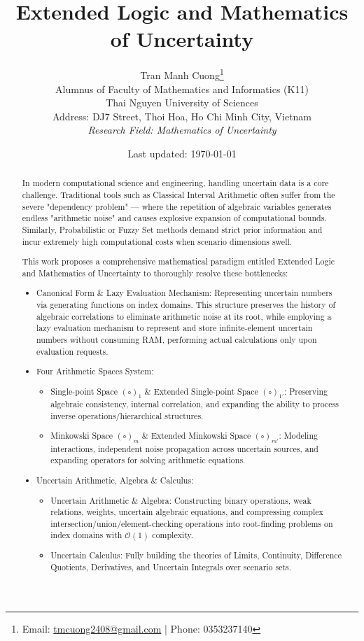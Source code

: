 \documentclass[a4paper,12pt, twoside]{memoir}
\title{Extended Logic and Mathematics of Uncertainty}
\author{
	Tran Manh Cuong\thanks{Email: \href{mailto:tmcuong2408@gmail.com}{tmcuong2408@gmail.com} | Phone: 0353237140} \\[0.5em]
	\small Alumnus of Faculty of Mathematics and Informatics (K11)
	\\ Thai Nguyen University of Sciences \\
	\small Address: DJ7 Street, Thoi Hoa, Ho Chi Minh City, Vietnam \\
	\small \textit{Research Field: Mathematics of Uncertainty}
}
\date{Last updated: \today}
\begin{document}
\maketitle

\begin{abstract}
	In modern computational science and engineering, handling uncertain data is a core challenge. Traditional tools such as Classical Interval Arithmetic often suffer from the severe "dependency problem" --- where the repetition of algebraic variables generates endless "arithmetic noise" and causes explosive expansion of computational bounds. Similarly, Probabilistic or Fuzzy Set methods demand strict prior information and incur extremely high computational costs when scenario dimensions swell.

	This work proposes a comprehensive mathematical paradigm entitled Extended Logic and Mathematics of Uncertainty to thoroughly resolve these bottlenecks:
	\begin{itemize}[leftmargin=*]
		\item Canonical Form \& Lazy Evaluation Mechanism: Representing uncertain numbers via generating functions on index domains. This structure preserves the history of algebraic correlations to eliminate arithmetic noise at its root, while employing a lazy evaluation mechanism to represent and store infinite-element uncertain numbers without consuming RAM, performing actual calculations only upon evaluation requests.

		\item Four Arithmetic Spaces System:
		      \begin{itemize}[leftmargin=*]
			      \item Single-point Space $(\circ)_1$ \& Extended Single-point Space $(\circ)_{1'}$: Preserving algebraic consistency, internal correlation, and expanding the ability to process inverse operations/hierarchical structures.
			      \item Minkowski Space $(\circ)_m$ \& Extended Minkowski Space $(\circ)_{m'}$: Modeling interactions, independent noise propagation across uncertain sources, and expanding operators for solving arithmetic equations.
		      \end{itemize}

		\item Uncertain Arithmetic, Algebra \& Calculus:
		      \begin{itemize}[leftmargin=*]
			      \item Uncertain Arithmetic \& Algebra: Constructing binary operations, weak relations, weights, uncertain algebraic equations, and compressing complex intersection/union/element-checking operations into root-finding problems on index domains with $\mathcal{O}(1)$ complexity.
			      \item Uncertain Calculus: Fully building the theories of Limits, Continuity, Difference Quotients, Derivatives, and Uncertain Integrals over scenario sets.
		      \end{itemize}
	\end{itemize}


\end{abstract}
\end{document}
